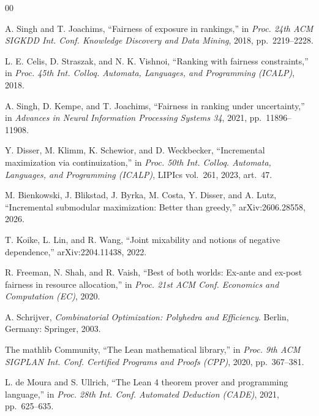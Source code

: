 \begin{thebibliography}{00}

 A. Singh and T. Joachims, ``Fairness of exposure in rankings,'' in
\emph{Proc. 24th ACM SIGKDD Int. Conf. Knowledge Discovery and Data Mining}, 2018,
pp.~2219--2228.

 L. E. Celis, D. Straszak, and N. K. Vishnoi, ``Ranking with fairness
constraints,'' in \emph{Proc. 45th Int. Colloq. Automata, Languages, and Programming
(ICALP)}, 2018.

 A. Singh, D. Kempe, and T. Joachims, ``Fairness in ranking under
uncertainty,'' in \emph{Advances in Neural Information Processing Systems 34}, 2021,
pp.~11896--11908.

 Y. Disser, M. Klimm, K. Schewior, and D. Weckbecker, ``Incremental
maximization via continuization,'' in \emph{Proc. 50th Int. Colloq. Automata, Languages, and
Programming (ICALP)}, LIPIcs vol.~261, 2023, art.~47.

 M. Bienkowski, J. Blikstad, J. Byrka, M. Costa, Y. Disser, and
A. Lutz, ``Incremental submodular maximization: Better than greedy,'' arXiv:2606.28558, 2026.

 T. Koike, L. Lin, and R. Wang, ``Joint mixability and notions of negative
dependence,'' arXiv:2204.11438, 2022.

 R. Freeman, N. Shah, and R. Vaish, ``Best of both worlds: Ex-ante and
ex-post fairness in resource allocation,'' in \emph{Proc. 21st ACM Conf. Economics and
Computation (EC)}, 2020.

 A. Schrijver, \emph{Combinatorial Optimization: Polyhedra and
Efficiency}. Berlin, Germany: Springer, 2003.

 The mathlib Community, ``The Lean mathematical library,'' in
\emph{Proc. 9th ACM SIGPLAN Int. Conf. Certified Programs and Proofs (CPP)}, 2020,
pp.~367--381.

 L. de Moura and S. Ullrich, ``The Lean 4 theorem prover and
programming language,'' in \emph{Proc. 28th Int. Conf. Automated Deduction (CADE)}, 2021,
pp.~625--635.

\end{thebibliography}


